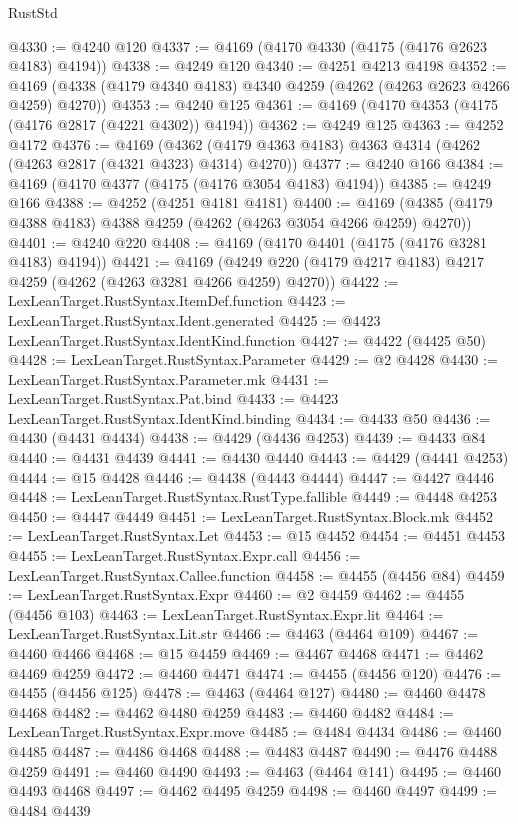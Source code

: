 \begin{lexlean}{RustStd}
\begin{coremodule}
@4330 := @4240 @120
@4337 := @4169 (@4170 @4330 (@4175 (@4176 @2623 @4183) @4194))
@4338 := @4249 @120
@4340 := @4251 @4213 @4198
@4352 := @4169 (@4338 (@4179 @4340 @4183) @4340 @4259 (@4262 (@4263 @2623 @4266 @4259) @4270))
@4353 := @4240 @125
@4361 := @4169 (@4170 @4353 (@4175 (@4176 @2817 (@4221 @4302)) @4194))
@4362 := @4249 @125
@4363 := @4252 @4172
@4376 := @4169
    (@4362 (@4179 @4363 @4183) @4363 @4314 (@4262 (@4263 @2817 (@4321 @4323) @4314) @4270))
@4377 := @4240 @166
@4384 := @4169 (@4170 @4377 (@4175 (@4176 @3054 @4183) @4194))
@4385 := @4249 @166
@4388 := @4252 (@4251 @4181 @4181)
@4400 := @4169 (@4385 (@4179 @4388 @4183) @4388 @4259 (@4262 (@4263 @3054 @4266 @4259) @4270))
@4401 := @4240 @220
@4408 := @4169 (@4170 @4401 (@4175 (@4176 @3281 @4183) @4194))
@4421 := @4169 (@4249 @220 (@4179 @4217 @4183) @4217 @4259 (@4262 (@4263 @3281 @4266 @4259) @4270))
@4422 := LexLeanTarget.RustSyntax.ItemDef.function
@4423 := LexLeanTarget.RustSyntax.Ident.generated
@4425 := @4423 LexLeanTarget.RustSyntax.IdentKind.function
@4427 := @4422 (@4425 @50)
@4428 := LexLeanTarget.RustSyntax.Parameter
@4429 := @2 @4428
@4430 := LexLeanTarget.RustSyntax.Parameter.mk
@4431 := LexLeanTarget.RustSyntax.Pat.bind
@4433 := @4423 LexLeanTarget.RustSyntax.IdentKind.binding
@4434 := @4433 @50
@4436 := @4430 (@4431 @4434)
@4438 := @4429 (@4436 @4253)
@4439 := @4433 @84
@4440 := @4431 @4439
@4441 := @4430 @4440
@4443 := @4429 (@4441 @4253)
@4444 := @15 @4428
@4446 := @4438 (@4443 @4444)
@4447 := @4427 @4446
@4448 := LexLeanTarget.RustSyntax.RustType.fallible
@4449 := @4448 @4253
@4450 := @4447 @4449
@4451 := LexLeanTarget.RustSyntax.Block.mk
@4452 := LexLeanTarget.RustSyntax.Let
@4453 := @15 @4452
@4454 := @4451 @4453
@4455 := LexLeanTarget.RustSyntax.Expr.call
@4456 := LexLeanTarget.RustSyntax.Callee.function
@4458 := @4455 (@4456 @84)
@4459 := LexLeanTarget.RustSyntax.Expr
@4460 := @2 @4459
@4462 := @4455 (@4456 @103)
@4463 := LexLeanTarget.RustSyntax.Expr.lit
@4464 := LexLeanTarget.RustSyntax.Lit.str
@4466 := @4463 (@4464 @109)
@4467 := @4460 @4466
@4468 := @15 @4459
@4469 := @4467 @4468
@4471 := @4462 @4469 @4259
@4472 := @4460 @4471
@4474 := @4455 (@4456 @120)
@4476 := @4455 (@4456 @125)
@4478 := @4463 (@4464 @127)
@4480 := @4460 @4478 @4468
@4482 := @4462 @4480 @4259
@4483 := @4460 @4482
@4484 := LexLeanTarget.RustSyntax.Expr.move
@4485 := @4484 @4434
@4486 := @4460 @4485
@4487 := @4486 @4468
@4488 := @4483 @4487
@4490 := @4476 @4488 @4259
@4491 := @4460 @4490
@4493 := @4463 (@4464 @141)
@4495 := @4460 @4493 @4468
@4497 := @4462 @4495 @4259
@4498 := @4460 @4497
@4499 := @4484 @4439

\end{coremodule}
\end{lexlean}
